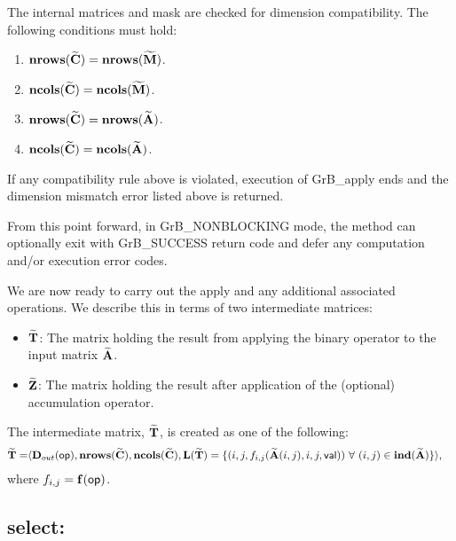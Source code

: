 The internal matrices and mask are checked for dimension compatibility. 
The following conditions must hold:
\begin{enumerate}
    \item $\bold{nrows}({\bf \widetilde{C}}) = \bold{nrows}({\bf \widetilde{M}})$.

    \item $\bold{ncols}({\bf \widetilde{C}}) = \bold{ncols}({\bf \widetilde{M}})$.

    \item $\bold{nrows}({\bf \widetilde{C}}) = \bold{nrows}({\bf \widetilde{A}})$.

    \item $\bold{ncols}({\bf \widetilde{C}}) = \bold{ncols}({\bf \widetilde{A}})$.
\end{enumerate}
If any compatibility rule above is violated, execution of {\sf GrB\_apply} ends and 
the dimension mismatch error listed above is returned.

From this point forward, in {\sf GrB\_NONBLOCKING} mode, the method can optionally exit
with {\sf GrB\_SUCCESS} return code and defer any computation and/or execution error codes.

We are now ready to carry out the apply and any additional 
associated operations.  We describe this in terms of two intermediate matrices:
\begin{itemize}
    \item ${\bf \widetilde{T}}$: The matrix holding the result from applying the binary operator to the input matrix
    ${\bf \widetilde{A}}$.

    \item ${\bf \widetilde{Z}}$: The matrix holding the result after 
    application of the (optional) accumulation operator.
\end{itemize}

The intermediate matrix, ${\bf \widetilde{T}}$, is created as one of the following:
\[
\begin{aligned}
{\bf \widetilde{T}} = & \langle \mbox{$\mathbf{D}_{out}$}({\sf op}),
                           \bold{nrows}({\bf \widetilde{C}}), 
                           \bold{ncols}({\bf \widetilde{C}}),  \bold{L}({\bf \widetilde{T}}) =
	\{(i,j,f_{i,j}({\bf \widetilde{A}}(i,j),i,j,{\sf val})) 
\ \forall \ (i,j) \in 
\bold{ind}({\bf \widetilde{A}}) \} \rangle,
\end{aligned}
\]
where $f_{i,j} = \mathbf{f}({\sf op})$. 








\subsection{{\sf select}: }
